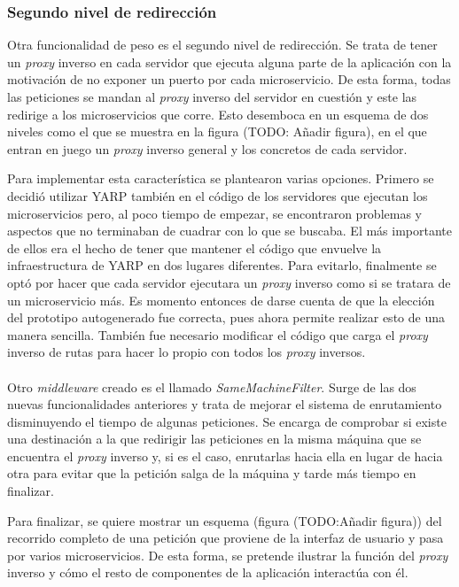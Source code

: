 \documentclass[11pt,spanish,listoffigures]{tfgetsinf}
\begin{document}
			\subsubsection{Segundo nivel de redirección}

Otra funcionalidad de peso es el segundo nivel de redirección. Se trata de tener un \emph{proxy} inverso en cada servidor que ejecuta alguna parte de la aplicación con la motivación de no exponer un puerto por cada microservicio. De esta forma, todas las peticiones se mandan al \emph{proxy} inverso del servidor en cuestión y este las redirige a los microservicios que corre. Esto desemboca en un esquema de dos niveles como el que se muestra en la figura (TODO: Añadir figura), en el que entran en juego un \emph{proxy} inverso general y los concretos de cada servidor.


Para implementar esta característica se plantearon varias opciones. Primero se decidió utilizar YARP también en el código de los servidores que ejecutan los microservicios pero, al poco tiempo de empezar, se encontraron problemas y aspectos que no terminaban de cuadrar con lo que se buscaba. El más importante de ellos era el hecho de tener que mantener el código que envuelve la infraestructura de YARP en dos lugares diferentes. Para evitarlo, finalmente se optó por hacer que cada servidor ejecutara un \emph{proxy} inverso como si se tratara de un microservicio más. Es momento entonces de darse cuenta de que la elección del prototipo autogenerado fue correcta, pues ahora permite realizar esto de una manera sencilla. También fue necesario modificar el código que carga el \emph{proxy} inverso de rutas para hacer lo propio con todos los \emph{proxy} inversos.\\\\

Otro \emph{middleware} creado es el llamado \emph{SameMachineFilter}. Surge de las dos nuevas funcionalidades anteriores y trata de mejorar el sistema de enrutamiento disminuyendo el tiempo de algunas peticiones. Se encarga de comprobar si existe una destinación a la que redirigir las peticiones en la misma máquina que se encuentra el \emph{proxy} inverso y, si es el caso, enrutarlas hacia ella en lugar de hacia otra para evitar que la petición salga de la máquina y tarde más tiempo en finalizar.

Para finalizar, se quiere mostrar un esquema (figura (TODO:Añadir figura)) del recorrido completo de una petición que proviene de la interfaz de usuario y pasa por varios microservicios. De esta forma, se pretende ilustrar la función del \emph{proxy} inverso y cómo el resto de componentes de la aplicación interactúa con él.
\end{document}

